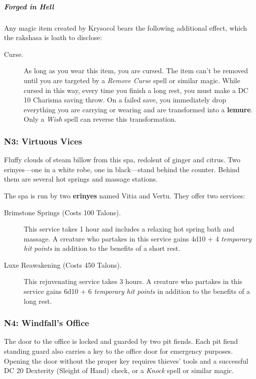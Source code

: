 \documentclass[10pt,a4paper,twoside,bg=print,twocolumn,openany,nodeprecatedcode]{dndbook}
\begin{document}
\subparagraph{Forged in Hell}
Any magic item created by Krysocol bears the following additional effect, which the rakshasa is loath to disclose:


\begin{description}
\item[Curse.]
As long as you wear this item, you are cursed. The item can't be removed until you are targeted by a \textit{Remove Curse} spell or similar magic. While cursed in this way, every time you finish a long rest, you must make a DC 10 Charisma saving throw. On a failed save, you immediately drop everything you are carrying or wearing and are transformed into a \textbf{lemure}. Only a \textit{Wish} spell can reverse this transformation.
\end{description}

\subsubsection{N3: Virtuous Vices}
\begin{DndReadAloud}{}
Fluffy clouds of steam billow from this spa, redolent of ginger and citrus. Two erinyes—one in a white robe, one in black—stand behind the counter. Behind them are several hot springs and massage stations.

\end{DndReadAloud}

The spa is run by two \textbf{erinyes} named Vitia and Vertu. They offer two services:


\begin{description}
\item[Brimstone Springs (Costs 100 Talons).]
This service takes 1 hour and includes a relaxing hot spring bath and massage. A creature who partakes in this service gains 4d10 + 4 \textit{temporary hit points} in addition to the benefits of a short rest.
\item[Luxe Reawakening (Costs 450 Talons).]
This rejuvenating service takes 3 hours. A creature who partakes in this service gains 6d10 + 6 \textit{temporary hit points} in addition to the benefits of a long rest.
\end{description}

\subsubsection{N4: Windfall's Office}
The door to the office is locked and guarded by two pit fiends. Each pit fiend standing guard also carries a key to the office door for emergency purposes. Opening the door without the proper key requires thieves' tools and a successful DC 20 Dexterity (Sleight of Hand) check, or a \textit{Knock} spell or similar magic.
\end{document}
